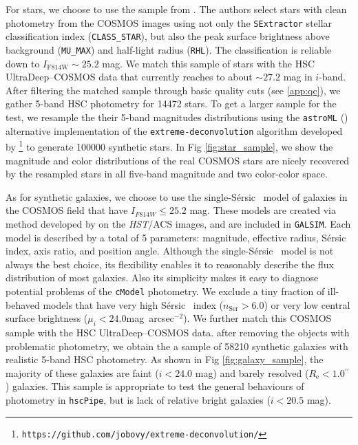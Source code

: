 \documentclass[useamsfonts]{pasj01}
\def\asec{$^{\prime\prime}$}
\def\sb{mag~arcsec$^{-2}$}
\def\ser{{S\'{e}rsic\ }}
\def\hscpipe{\texttt{hscPipe}}
\def\cmodel{\texttt{cModel}}
\def\galsim{\texttt{G}{\scriptsize \texttt{AL}}\texttt{S}{\scriptsize \texttt{IM}}}
\begin{document}
    For stars, we choose to use the sample from \citet{Leauthaud2007}. 
    The authors select stars with clean photometry from the COSMOS images using not 
    only the \texttt{SExtractor} stellar classification index (\texttt{CLASS\_STAR}), 
    but also the peak surface brightness above background (\texttt{MU\_MAX}) and 
    half-light radius (\texttt{RHL}).
    The classification is reliable down to $I_{\mathrm{F814W}}{\sim}25.2$ mag.  
    We match this sample of stars with the HSC UltraDeep--COSMOS data that currently 
    reaches to about ${\sim}27.2$ mag in $i$-band. 
    After filtering the matched sample through basic quality cuts (see \ref{app:qc}),
    we gather 5-band HSC photometry for 14472 stars.
    To get a larger sample for the test, we resample the their 5-band magnitudes
    distributions using the \texttt{astroML} (\citealt{astroml}) alternative 
    implementation of the \texttt{extreme-deconvolution} algorithm developed by 
    \citet{Bovy2011}
    \footnote{\texttt{https://github.com/jobovy/extreme-deconvolution/}} to 
    generate 100000 synthetic stars. 
    In Fig \ref{fig:star_sample}, we show the magnitude and color distributions of 
    the real COSMOS stars are nicely recovered by the resampled stars in all 
    five-band magnitude and two color-color space.
      
    As for synthetic galaxies, we choose to use the single-\ser{} model of galaxies
    in the COSMOS field that have $I_{F814W} \leq 25.2$ mag. 
    These models are created via method developed by \citet{Lackner2012} on the 
    \textit{HST}/ACS images, and are included in \galsim{}. 
    Each model is described by a total of 5 parameters: magnitude, effective radius, 
    \ser{} index, axis ratio, and position angle. 
    Although the single-\ser{} model is not always the best choice, its flexibility 
    enables it to reasonably describe the flux distribution of most galaxies.
    Also its simplicity makes it easy to diagnose potential problems of the
    \cmodel{} photometry. 
    We exclude a tiny fraction of ill-behaved models that have very high \ser{} 
    index ($n_{\mathrm{Ser}} > 6.0$) or very low central surface brightness 
    ($\mu_{i} < 24.0$\sb). 
    We further match this COSMOS sample with the HSC UltraDeep--COSMOS data. 
    after removing the objects with problematic photometry, we obtain the a sample of 
    58210 synthetic galaxies with realistic 5-band HSC photometry. 
    As shown in Fig \ref{fig:galaxy_sample}, the majority of these galaxies are 
    faint ($i<24.0$ mag) and barely resolved ($R_{\mathrm{e}}< 1.0$\asec) galaxies. 
    This sample is appropriate to test the general behaviours of photometry in 
    \hscpipe{}, but is lack of relative bright galaxies ($i<20.5$ mag). 
    
\end{document}
